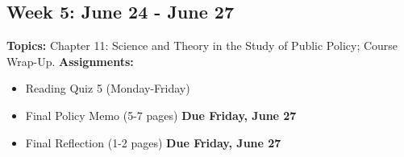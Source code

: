 \documentclass[11pt, letterpaper]{article}
\begin{document}
\subsection*{Week 5: June 24 - June 27}
\textbf{Topics:} \newline
Chapter 11: Science and Theory in the Study of Public Policy; Course Wrap-Up.\newline
\textbf{Assignments:} \begin{itemize}
  \item Reading Quiz 5 (Monday-Friday)
  \item Final Policy Memo (5-7 pages) \textbf{Due Friday, June 27}
  \item Final Reflection (1-2 pages) \textbf{Due Friday, June 27}
\end{itemize}
\end{document}

